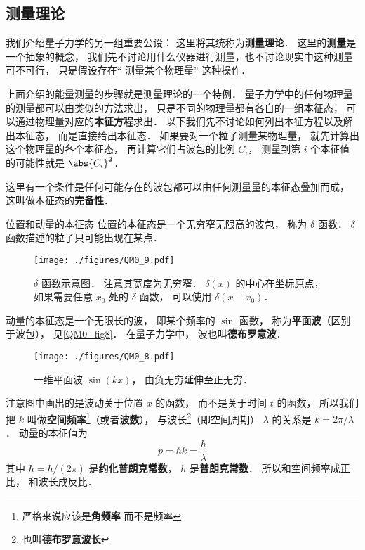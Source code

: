 \subsection{测量理论}
我们介绍量子力学的另一组重要公设： 这里将其统称为\textbf{测量理论}． 这里的\textbf{测量}是一个抽象的概念， 我们先不讨论用什么仪器进行测量，也不讨论现实中这种测量可不可行， 只是假设存在“ 测量某个物理量” 这种操作．

上面介绍的能量测量的步骤就是测量理论的一个特例． 量子力学中的任何物理量的测量都可以由类似的方法求出， 只是不同的物理量都有各自的一组本征态， 可以通过物理量对应的\textbf{本征方程}求出． 以下我们先不讨论如何列出本征方程以及解出本征态， 而是直接给出本征态． 如果要对一个粒子测量某物理量， 就先计算出这个物理量的各个本征态， 再计算它们占波包的比例 $C_i$， 测量到第 $i$ 个本征值的可能性就是 $\abs{C_i}^2$．

这里有一个条件是任何可能存在的波包都可以由任何测量量的本征态叠加而成， 这叫做本征态的\textbf{完备性}．

\begin{example}{位置和动量的本征态}
位置的本征态是一个无穷窄无限高的波包， 称为 $\delta$ 函数． $\delta$ 函数描述的粒子只可能出现在某点． 
\begin{figure}[ht]
\centering
\texttt{[image: ./figures/QM0\_9.pdf]}
\caption{$\delta$ 函数示意图． 注意其宽度为无穷窄． $\delta(x)$ 的中心在坐标原点， 如果需要任意 $x_0$ 处的 $\delta$ 函数， 可以使用 $\delta(x - x_0)$．} \label{QM0_fig9} %
\end{figure}

动量的本征态是一个无限长的波， 即某个频率的 $\sin$ 函数， 称为\textbf{平面波}（区别于波包）， 见\autoref{QM0_fig8}． 在量子力学中， 波也叫\textbf{德布罗意波}．

\begin{figure}[ht]
\centering
\texttt{[image: ./figures/QM0\_8.pdf]}
\caption{一维平面波 $\sin(kx)$， 由负无穷延伸至正无穷．} \label{QM0_fig8}
\end{figure}

注意图中画出的是波动关于位置 $x$ 的函数， 而不是关于时间 $t$ 的函数， 所以我们把 $k$ 叫做\textbf{空间频率}\footnote{严格来说应该是\textbf{角频率} 而不是频率}（或者\textbf{波数}）， %
与波长\footnote{也叫\textbf{德布罗意波长}}（即空间周期） $\lambda$ 的关系是 $k = 2\pi/\lambda$． 动量的本征值为
\begin{equation}\label{QM0_eq1}
p = \hbar k = \frac{h}{\lambda}
\end{equation}
其中 $\hbar = h / (2\pi)$ 是\textbf{约化普朗克常数}， $h$ 是\textbf{普朗克常数}． 所以和空间频率成正比， 和波长成反比．
\end{example}


